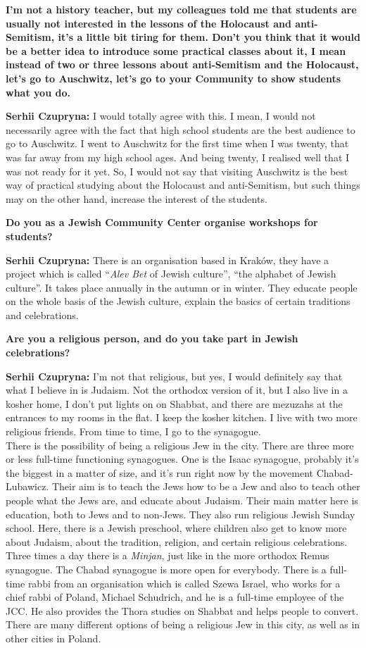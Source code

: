 \textbf{I’m not a history teacher, but my colleagues told me that students are usually not interested in the lessons of the Holocaust and anti-Semitism, it’s a little bit tiring for them. Don’t you think that it would be a better idea to introduce some practical classes about it, I mean instead of two or three lessons about anti-Semitism and the Holocaust, let’s go to Auschwitz, let’s go to your Community to show students what you do.}\par
\textbf{Serhii Czupryna:} I would totally agree with this. I mean, I would not necessarily agree with the fact that high school students are the best audience to go to Auschwitz. I went to Auschwitz for the first time when I was twenty, that was far away from my high school ages. And being twenty, I realised well that I was not ready for it yet. So, I would not say that visiting Auschwitz is the best way of practical studying about the Holocaust and anti-Semitism, but such things may on the other hand, increase the interest of the students.\par  
\textbf{Do you as a Jewish Community Center organise workshops for students?} \par  
\textbf{Serhii Czupryna:} There is an organisation based in Kraków, they have a project which is called ``\textit{Alev Bet} of Jewish culture'', ``the alphabet of Jewish culture''. It takes place annually in the autumn or in winter. They educate people on the whole basis of the Jewish culture, explain the basics of certain traditions and celebrations.\par 
\textbf{Are you a religious person, and do you take part in Jewish celebrations?} \par
\textbf{Serhii Czupryna:} I’m not that religious, but yes, I would definitely say that what I believe in is Judaism. Not the orthodox version of it, but I also live in a kosher home, I don’t put lights on on Shabbat, and there are mezuzahs at the entrances to my rooms in the flat. I keep the kosher kitchen. I live with two more religious friends. From time to time, I go to the synagogue. \\
There is the possibility of being a religious Jew in the city. There are three more or less full-time functioning synagogues. One is the Isaac synagogue, probably it’s the biggest in a matter of size, and it’s run right now by the movement Chabad-Lubawicz. Their aim is to teach the Jews how to be a Jew and also to teach other people what the Jews are, and educate about Judaism. Their main matter here is education, both to Jews and to non-Jews. They also run religious Jewish Sunday school. Here, there is a Jewish preschool, where children also get to know more about Judaism, about the tradition, religion, and certain religious celebrations. Three times a day there is a \textit{Minjan}, just like in the more orthodox Remus synagogue. The Chabad synagogue is more open for everybody. There is a full-time rabbi from an organisation which is called Szewa Israel, who works for a chief rabbi of Poland, Michael Schudrich, and he is a full-time employee of the JCC. He also provides the Thora studies on Shabbat and helps people to convert. There are many different options of being a religious Jew in this city, as well as in other cities in Poland.\par  
